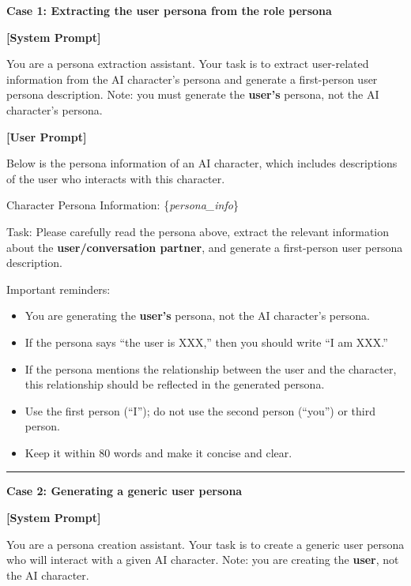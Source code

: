 \begin{tcolorbox}[
    breakable,
    colback=MyWordColor1,
    colframe=black,
    boxrule=0.6pt,
    arc=1.5mm,
    title={\textbf{Prompt for User Persona Generation}},
    fontupper=\small
]

\textbf{Case 1: Extracting the user persona from the role persona}

\medskip
\textbf{[System Prompt]}

You are a persona extraction assistant. Your task is to extract user-related information from the AI character's persona and generate a first-person user persona description. Note: you must generate the \textbf{user's} persona, not the AI character's persona.

\medskip
\textbf{[User Prompt]}

Below is the persona information of an AI character, which includes descriptions of the user who interacts with this character.

\medskip
Character Persona Information:
\{\textit{persona\_info}\}

\medskip
Task: Please carefully read the persona above, extract the relevant information about the \textbf{user/conversation partner}, and generate a first-person user persona description.

\medskip
Important reminders:
\begin{itemize}
    \item You are generating the \textbf{user's} persona, not the AI character's persona.
    \item If the persona says ``the user is XXX,'' then you should write ``I am XXX.''
    \item If the persona mentions the relationship between the user and the character, this relationship should be reflected in the generated persona.
    \item Use the first person (``I''); do not use the second person (``you'') or third person.
    \item Keep it within 80 words and make it concise and clear.
\end{itemize}

\bigskip
\hrule
\bigskip

\textbf{Case 2: Generating a generic user persona}

\medskip
\textbf{[System Prompt]}

You are a persona creation assistant. Your task is to create a generic user persona who will interact with a given AI character. Note: you are creating the \textbf{user}, not the AI character.


\end{tcolorbox}
